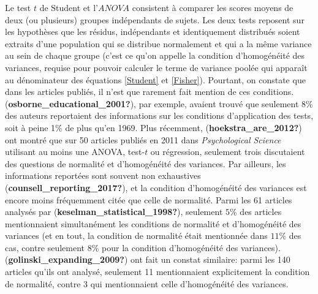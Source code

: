 \documentclass[
  english,
  man]{apa6}
\begin{document}
Le test \(t\) de Student et l'\(ANOVA\) consistent à comparer les scores moyens de deux (ou plusieurs) groupes indépendants de sujets. Les deux tests reposent sur les hypothèses que les résidus, indépendants et identiquement distribués soient extraits d'une population qui se distribue normalement et qui a la même variance au sein de chaque groupe (c'est ce qu'on appelle la condition d'homogénéité des variances, requise pour pouvoir calculer le terme de variance poolée qui apparaît au dénominateur des équations \eqref{Student} et \eqref{Fisher}). Pourtant, on constate que dans les articles publiés, il n'est que rarement fait mention de ces conditions. (\textbf{osborne\_educational\_2001?}), par exemple, avaient trouvé que seulement 8\% des auteurs reportaient des informations sur les conditions d'application des tests, soit à peine 1\% de plus qu'en 1969. Plus récemment, (\textbf{hoekstra\_are\_2012?}) ont montré que sur 50 articles publiés en 2011 dans \emph{Psychological Science} utilisant au moins une ANOVA, test-\(t\) ou régression, seulement trois discutaient des questions de normalité et d'homogénéité des variances. Par ailleurs, les informations reportées sont souvent non exhaustives (\textbf{counsell\_reporting\_2017?}), et la condition d'homogénéité des variances est encore moins fréquemment citée que celle de normalité. Parmi les 61 articles analysés par (\textbf{keselman\_statistical\_1998?}), seulement \(5\%\) des articles mentionnaient simultanément les conditions de normalité et d'homogénéité des variances (et en tout, la condition de normalité était mentionnée dans \(11\%\) des cas, contre seulement 8\% pour la condition d'homogénéité des variances). (\textbf{golinski\_expanding\_2009?}) ont fait un constat similaire: parmi les 140 articles qu'ils ont analysé, seulement 11 mentionnaient explicitement la condition de normalité, contre 3 qui mentionnaient celle d'homogénéité des variances.
\end{document}
